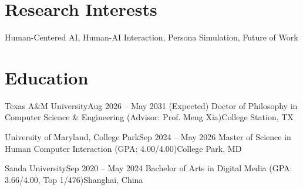 \section{Research Interests}

\noindent Human-Centered AI, Human-AI Interaction, Persona Simulation, Future of Work

\section{Education}
    \resumeSubHeadingListStart
    
    \resumeSubheading
    {Texas A\&M University}{Aug 2026 -- May 2031 (Expected)}
    {Doctor of Philosophy in Computer Science \& Engineering (Advisor: Prof. Meng Xia)}{College Station, TX}
    
    \resumeSubheading
    {University of Maryland, College Park}{Sep 2024 -- May 2026 }
    {Master of Science in Human Computer Interaction (GPA: 4.00/4.00)}{College Park, MD}

    \resumeSubheading
    {Sanda University}{Sep 2020 -- May 2024}
    {Bachelor of Arts in Digital Media (GPA: 3.66/4.00, Top 1/476)}{Shanghai, China}

    \resumeSubHeadingListEnd
